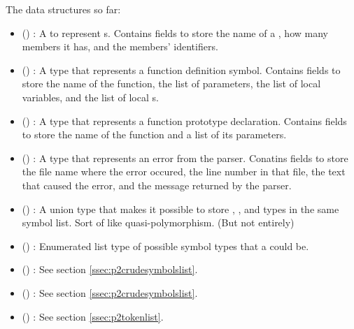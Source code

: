 \documentclass{article}
\begin{document}
The data structures so far:
\begin{itemize}
    \item () : A  to represent s.
    Contains fields to store the name of a , how many members it has, and the members' identifiers.
    \item () : A type that represents a function definition symbol.
    Contains fields to store the name of the function, the list of parameters, the list of local variables, and the list of local s.
    \item () : A type that represents a function prototype declaration.
    Contains fields to store the name of the function and a list of its parameters.
    \item () : A type that represents an error from the parser.
    Conatins fields to store the file name where the error occured, the line number in that file, the text that caused the error, and the message returned by the parser.
    \item () : A union type that makes it possible to store , , and  types in the same symbol list.
    Sort of like quasi-polymorphism. (But not entirely)
    \item () : Enumerated list type of possible symbol types that a  could be.
    \item () : See section \ref{ssec:p2crudesymbolslist}.
    \item () : See section \ref{ssec:p2crudesymbolslist}.
    \item () : See section \ref{ssec:p2tokenlist}.
\end{itemize}
\end{document}
